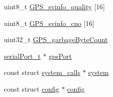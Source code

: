 \begin{DoxyCompactItemize}
\item 
uint8\+\_\+t \hyperlink{structgps_a53848f08ff505235e3a9b88ab9363d7a}{G\+P\+S\+\_\+svinfo\+\_\+quality} \mbox{[}16\mbox{]}
\item 
uint8\+\_\+t \hyperlink{structgps_a59a2afa1dd99043f3b951730ccd3cd27}{G\+P\+S\+\_\+svinfo\+\_\+cno} \mbox{[}16\mbox{]}
\item 
uint32\+\_\+t \hyperlink{structgps_a21619a61364bab3abe1e5c793c92cb4b}{G\+P\+S\+\_\+garbage\+Byte\+Count}
\item 
\hyperlink{drivers_2serial_8h_a64a5e2f04e1a908fbb1b3b165f88e0ef}{serial\+Port\+\_\+t} $\ast$ \hyperlink{structgps_a7fd3c434677f4d8b8b64f4596a276d64}{gps\+Port}
\item 
const struct \hyperlink{structsystem__calls}{system\+\_\+calls} $\ast$ \hyperlink{structgps_a0eaf8e4b1c5d62ec0e2b9bfad8016764}{system}
\item 
const struct \hyperlink{structconfig}{config} $\ast$ \hyperlink{structgps_a5a3a1380775087b5c95a854e72efd167}{config}
\end{DoxyCompactItemize}


